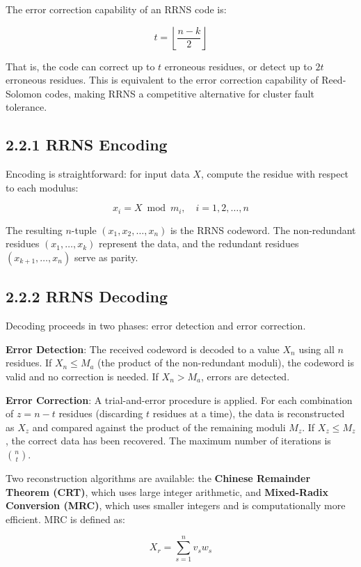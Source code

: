 \documentclass[
  12pt,
  a4paper]{report}
\begin{document}
The error correction capability of an RRNS code is:

\[t = \left\lfloor \frac{n - k}{2} \right\rfloor\]

That is, the code can correct up to \(t\) erroneous residues, or detect
up to \(2t\) erroneous residues. This is equivalent to the error
correction capability of Reed-Solomon codes, making RRNS a competitive
alternative for cluster fault tolerance.

\subsection{2.2.1 RRNS Encoding}\label{rrns-encoding}

Encoding is straightforward: for input data \(X\), compute the residue
with respect to each modulus:

\[x_i = X \bmod m_i, \quad i = 1, 2, \ldots, n\]

The resulting \(n\)-tuple \((x_1, x_2, \ldots, x_n)\) is the RRNS
codeword. The non-redundant residues \((x_1, \ldots, x_k)\) represent
the data, and the redundant residues \((x_{k+1}, \ldots, x_n)\) serve as
parity.

\subsection{2.2.2 RRNS Decoding}\label{rrns-decoding}

Decoding proceeds in two phases: error detection and error correction.

\textbf{Error Detection}: The received codeword is decoded to a value
\(X_n\) using all \(n\) residues. If \(X_n \leq M_a\) (the product of
the non-redundant moduli), the codeword is valid and no correction is
needed. If \(X_n > M_a\), errors are detected.

\textbf{Error Correction}: A trial-and-error procedure is applied. For
each combination of \(z = n - t\) residues (discarding \(t\) residues at
a time), the data is reconstructed as \(X_z\) and compared against the
product of the remaining moduli \(M_z\). If \(X_z \leq M_z\), the
correct data has been recovered. The maximum number of iterations is
\(\binom{n}{t}\).

Two reconstruction algorithms are available: the \textbf{Chinese
Remainder Theorem (CRT)}, which uses large integer arithmetic, and
\textbf{Mixed-Radix Conversion (MRC)}, which uses smaller integers and
is computationally more efficient. MRC is defined as:

\[X_r = \sum_{s=1}^{n} v_s w_s\]
\end{document}
